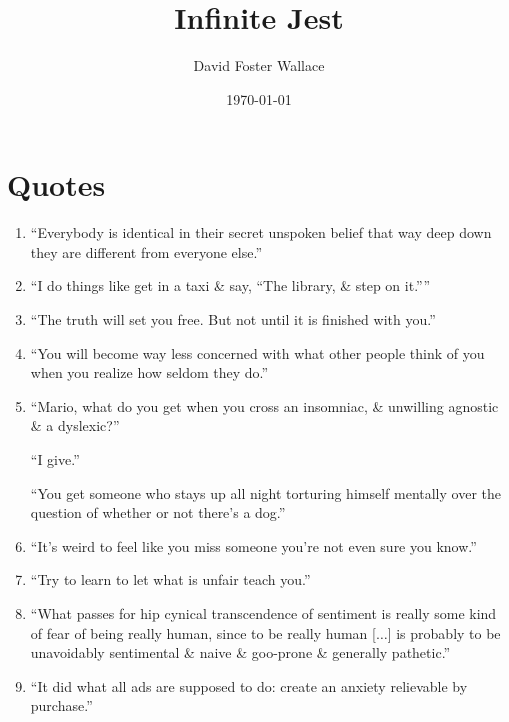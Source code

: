 \documentclass{article}
\title{Infinite Jest}
\author{David Foster Wallace}
\date{\today}
\numberwithin{equation}{section}
\begin{document}
\maketitle
\tableofcontents


\section{Quotes}

\begin{enumerate}
	\item ``Everybody is identical in their secret unspoken belief that way deep down they are different from everyone else.''
	\item ``I do things like get in a taxi \& say, ``The library, \& step on it.''''
	\item ``The truth will set you free. But not until it is finished with you.''
	\item ``You will become way less concerned with what other people think of you when you realize how seldom they do.''
	\item ``Mario, what do you get when you cross an insomniac, \& unwilling agnostic \& a dyslexic?''
	
	``I give.''
	
	``You get someone who stays up all night torturing himself mentally over the question of whether or not there's a dog.''
	\item ``It's weird to feel like you miss someone you're not even sure you know.''
	\item ``Try to learn to let what is unfair teach you.''
	\item ``What passes for hip cynical transcendence of sentiment is really some kind of fear of being really human, since to be really human [$\ldots$] is probably to be unavoidably sentimental \& naive \& goo-prone \& generally pathetic.''
	\item ``It did what all ads are supposed to do: create an anxiety relievable by purchase.''
\end{enumerate}


\printbibliography[heading=bibintoc]
	
\end{document}
